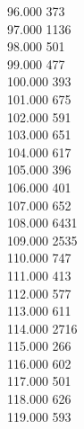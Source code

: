 { 96.000	373 \\
 97.000	1136 \\
 98.000	501 \\
 99.000	477 \\
 100.000	393 \\
 101.000	675 \\
 102.000	591 \\
 103.000	651 \\
 104.000	617 \\
 105.000	396 \\
 106.000	401 \\
 107.000	652 \\
 108.000	6431 \\
 109.000	2535 \\
 110.000	747 \\
 111.000	413 \\
 112.000	577 \\
 113.000	611 \\
 114.000	2716 \\
 115.000	266 \\
 116.000	602 \\
 117.000	501 \\
 118.000	626 \\
 119.000	593 \\
}
